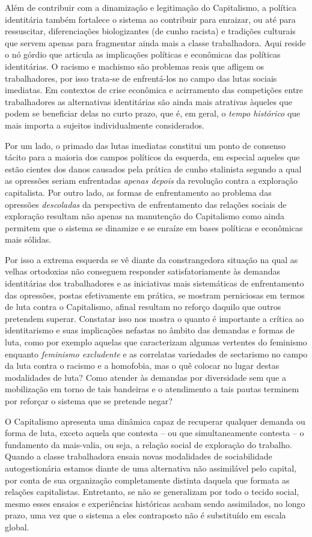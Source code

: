 Além de contribuir com a dinamização e legitimação do Capitalismo, a
política identitária também fortalece o sistema ao contribuir para
enraizar, ou até para ressuscitar, diferenciações biologizantes (de
cunho racista) e tradições culturais que servem apenas para fragmentar
ainda mais a classe trabalhadora. Aqui reside o nó górdio que articula
as implicações políticas e econômicas das políticas identitárias. O
racismo e machismo são problemas reais que afligem os trabalhadores, por
isso trata-se de enfrentá-los no campo das lutas sociais imediatas. Em
contextos de crise econômica e acirramento das competições entre
trabalhadores as alternativas identitárias são ainda mais atrativas
àqueles que podem se beneficiar delas no curto prazo, que é, em geral, o
\emph{tempo histórico} que mais importa a sujeitos individualmente
considerados.

Por um lado, o primado das lutas imediatas constitui um ponto de
consenso tácito para a maioria dos campos políticos da esquerda, em
especial aqueles que estão cientes dos danos causados pela prática de
cunho stalinista segundo a qual as opressões seriam enfrentadas
\emph{apenas depois} da revolução contra a exploração capitalista. Por
outro lado, as formas de enfrentamento ao problema das opressões
\emph{descoladas} da perspectiva de enfrentamento das relações sociais
de exploração resultam não apenas na manutenção do Capitalismo como
ainda permitem que o sistema se dinamize e se enraíze em bases políticas
e econômicas mais sólidas.

Por isso a extrema esquerda se vê diante da constrangedora situação na
qual as velhas ortodoxias não conseguem responder satisfatoriamente às
demandas identitárias dos trabalhadores e as iniciativas mais
sistemáticas de enfrentamento das opressões, postas efetivamente em
prática, se mostram perniciosas em termos de luta contra o Capitalismo,
afinal resultam no reforço daquilo que outros pretendem superar.
Constatar isso nos mostra o quanto é importante a crítica ao
identitarismo e suas implicações nefastas no âmbito das demandas e
formas de luta, como por exemplo aquelas que caracterizam algumas
vertentes do feminismo enquanto \emph{feminismo excludente} e as
correlatas variedades de sectarismo no campo da luta contra o racismo e
a homofobia, mas o quê colocar no lugar destas modalidades de luta? Como
atender às demandas por diversidade sem que a mobilização em torno de
tais bandeiras e o atendimento a tais pautas terminem por reforçar o
sistema que se pretende negar?

O Capitalismo apresenta uma dinâmica capaz de recuperar qualquer demanda
ou forma de luta, exceto aquela que contesta -- ou que simultaneamente
contesta -- o fundamento da mais-valia, ou seja, a relação social de
exploração do trabalho. Quando a classe trabalhadora ensaia novas
modalidades de sociabilidade autogestionária estamos diante de uma
alternativa não assimilável pelo capital, por conta de sua organização
completamente distinta daquela que formata as relações capitalistas.
Entretanto, se não se generalizam por todo o tecido social, mesmo esses
ensaios e experiências históricas acabam sendo assimilados, no longo
prazo, uma vez que o sistema a eles contraposto não é substituído em
escala global.

